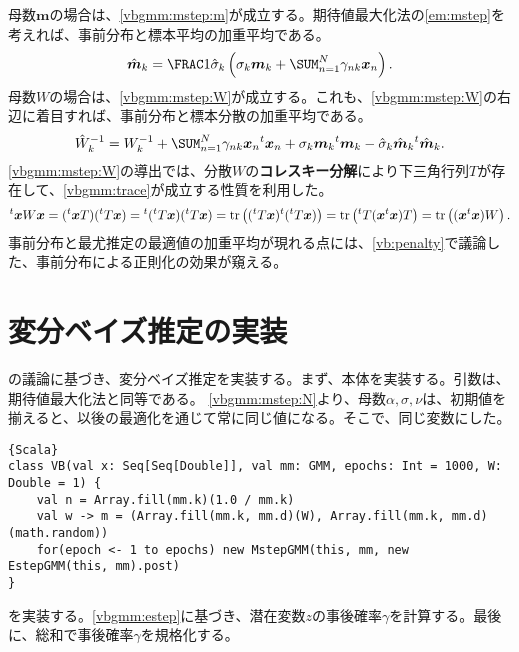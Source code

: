 \documentclass[10pt,a4paper]{book}
\begin{document}
%
母数$\bm{m}$の場合は、\eqref{vbgmm:mstep:m}が成立する。期待値最大化法の\eqref{em:mstep}を考えれば、事前分布と標本平均の加重平均である。
%
\begin{equation}
\label{eq:vbgmm:mstep:m}
\hat{\bm{m}}_k = \frac{1}{\hat{\sigma}_k} \tup{\sigma_k \bm{m}_k + \sum_{n=1}^N \gamma_{nk} \bm{x}_n}.
\end{equation}
%
母数$W$の場合は、\eqref{vbgmm:mstep:W}が成立する。これも、\eqref{vbgmm:mstep:W}の右辺に着目すれば、事前分布と標本分散の加重平均である。
%
\begin{equation}
\label{eq:vbgmm:mstep:W}
\hat{W}_k^{-1} =
W_k^{-1}+\sum_{n=1}^N\gamma_{nk}\bm{x}_n\trans{\bm{x}_n}+\sigma_k\bm{m}_k\trans{\bm{m}_k}-\hat{\sigma}_k\hat{\bm{m}}_k\trans{\hat{\bm{m}}_k}.
\end{equation}
%
\eqref{vbgmm:mstep:W}の導出では、分散$W$の\textbf{コレスキー分解}により下三角行列$T$が存在して、\eqref{vbgmm:trace}が成立する性質を利用した。
%
\begin{equation}
\label{eq:vbgmm:trace}
{}^t\bm{x} W \bm{x} =
({}^t\bm{x} T) ({}^tT \bm{x}) =
{}^t({}^tT \bm{x}) ({}^tT \bm{x}) =
\mathrm{tr}\left(({}^tT \bm{x}) {}^t({}^tT \bm{x})\right) =
\mathrm{tr}\left({}^tT (\bm{x} {}^t\bm{x}) T\right) =
\mathrm{tr}\left((\bm{x} {}^t\bm{x}) W\right).
\end{equation}
%
事前分布と最尤推定の最適値の加重平均が現れる点には、\eqref{vb:penalty}で議論した、事前分布による正則化の効果が窺える。

\section{変分ベイズ推定の実装}

の議論に基づき、変分ベイズ推定を実装する。まず、本体を実装する。引数は、期待値最大化法と同等である。
\eqref{vbgmm:mstep:N}より、母数$\alpha,\sigma,\nu$は、初期値を揃えると、以後の最適化を通じて常に同じ値になる。そこで、同じ変数にした。

\begin{Verbatim}{Scala}
class VB(val x: Seq[Seq[Double]], val mm: GMM, epochs: Int = 1000, W: Double = 1) {
	val n = Array.fill(mm.k)(1.0 / mm.k)
	val w -> m = (Array.fill(mm.k, mm.d)(W), Array.fill(mm.k, mm.d)(math.random))
	for(epoch <- 1 to epochs) new MstepGMM(this, mm, new EstepGMM(this, mm).post)
}
\end{Verbatim}

\Estep{}を実装する。\eqref{vbgmm:estep}に基づき、潜在変数$z$の事後確率$\gamma$を計算する。最後に、総和で事後確率$\gamma$を規格化する。
\end{document}
